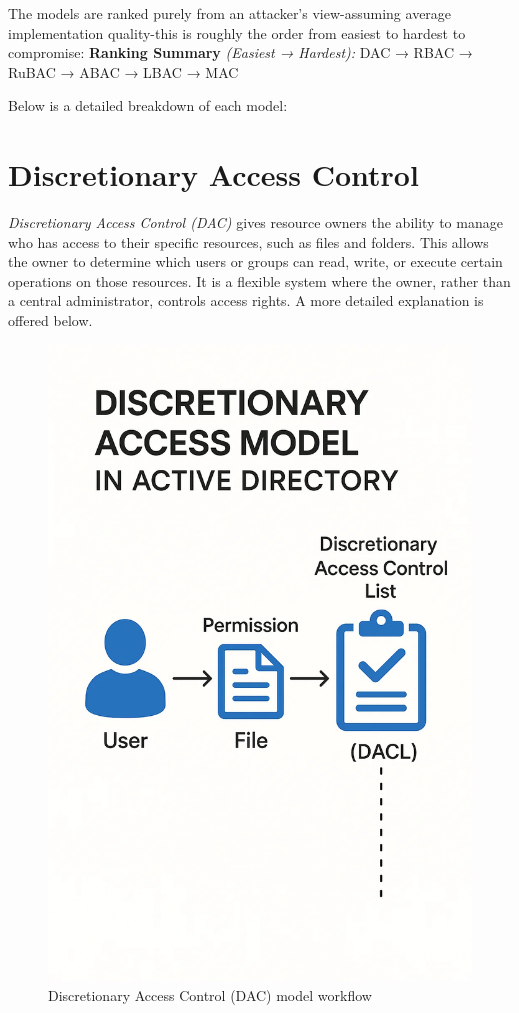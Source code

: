 The models are ranked purely from an attacker's view-assuming average implementation quality-this is roughly the order from easiest to hardest to compromise:
\textbf{Ranking Summary} \textit{(Easiest →  Hardest):}
DAC →  RBAC →  RuBAC →  ABAC →  LBAC →  MAC

Below is a detailed breakdown of each model:

\section{Discretionary Access Control}
\textit{Discretionary Access Control (DAC)} gives resource owners the ability to manage who has access to their specific resources, such as files and folders. This allows the owner to determine which users or groups can read, write, or execute certain operations on those resources. It is a flexible system where the owner, rather than a central administrator, controls access rights. A more detailed explanation is offered below.

\begin{figure}
    \centering
    \includegraphics[width=0.75\linewidth]{dac.png}
    \caption{Discretionary Access Control (DAC) model workflow}
    \label{fig:placeholder}
\end{figure}

